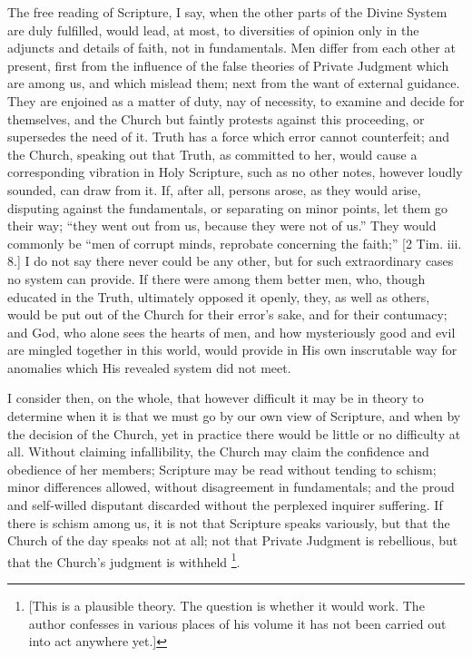 The free reading of Scripture, I say, when the other parts of the
Divine System are duly fulfilled, would lead, at most, to diversities
of opinion only in the adjuncts and details of faith, not in
fundamentals. Men differ from each other at present, first from the
influence of the false theories of Private Judgment which are among
us, and which mislead them; next from the want of external guidance.
They are enjoined as a matter of duty, nay of necessity, to examine
and decide for themselves, and the Church but faintly protests against
this proceeding, or supersedes the need of it. Truth has a force which
error cannot counterfeit; and the Church, speaking out that Truth, as
committed to her, would cause a corresponding vibration in Holy
Scripture, such as no other notes, however loudly sounded, can draw
from it. If, after all, persons arose, as they would arise, disputing
against the fundamentals, or separating on minor points, let them go
their way; ``they went out from us, because they were not of
us.'' They would commonly be ``men of corrupt minds, reprobate
concerning the faith;'' [2 Tim. iii. 8.] I do not say there never
could be any other, but for such extraordinary cases no system can
provide. If there were among them better men, who, though educated in
the Truth, ultimately opposed it openly, they, as well as others,
would be put out of the Church for their error's sake, and for their
contumacy; and God, who alone sees the hearts of men, and how
mysteriously good and evil are mingled together in this world, would
provide in His own inscrutable way for anomalies which His revealed
system did not meet.

I consider then, on the whole, that however difficult it may
be in theory to determine when it is that we must go by our own view
of Scripture, and when by the decision of the Church, yet in practice
there would be little or no difficulty at all. Without claiming
infallibility, the Church may claim the confidence and obedience of
her members; Scripture may be read without tending to schism; minor
differences allowed, without disagreement in fundamentals; and the
proud and self-willed disputant discarded without the perplexed
inquirer suffering. If there is schism among us, it is not that
Scripture speaks variously, but that the Church of the day speaks not
at all; not that Private Judgment is rebellious, but that the Church's
judgment is withheld \footnote{[This is a plausible theory. The question is
whether it would work. The author confesses in various places of his
volume it has not been carried out into act anywhere yet.]}.

